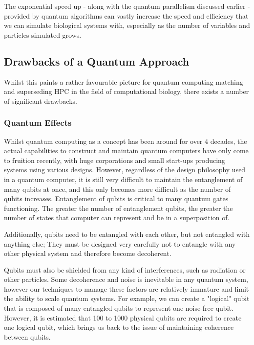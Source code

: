 \noindent
The exponential speed up - along with the quantum parallelism discussed earlier - provided by quantum algorithms can vastly increase the speed and efficiency that we can simulate biological systems with, especially as the number of variables and particles simulated grows.

{}
\subsection*{Drawbacks of a Quantum Approach}
Whilst this paints a rather favourable picture for quantum computing matching and superseding HPC in the field of computational biology, there exists a number of significant drawbacks.

{}
\subsubsection*{Quantum Effects}
Whilst quantum computing as a concept has been around for over 4 decades, the actual capabilities to construct and maintain quantum computers have only come to fruition recently, with huge corporations and small start-ups producing systems using various designs. However, regardless of the design philosophy used in a quantum computer, it is still very difficult to maintain the entanglement of many qubits at once, and this only becomes more difficult as the number of qubits increases. Entanglement of qubits is critical to many quantum gates functioning. The greater the number of entanglement qubits, the greater the number of states that computer can represent and be in a superposition of.

Additionally, qubits need to be entangled with each other, but not entangled with anything else; They must be designed very carefully not to entangle with any other physical system and therefore become decoherent.

Qubits must also be shielded from any kind of interferences, such as radiation or other particles. Some decoherence and noise is inevitable in any quantum system, however our techniques to manage these factors are relatively immature and limit the ability to scale quantum systems. For example, we can create a "logical" qubit that is composed of many entangled qubits to represent one noise-free qubit. However, it is estimated that 100 to 1000 physical qubits are required to create one logical qubit, which brings us back to the issue of maintaining coherence between qubits.

